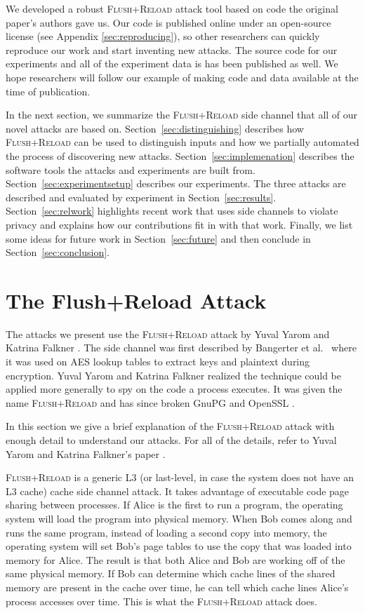 \documentclass[letterpaper,twocolumn,10pt]{article}
\begin{document}
We developed a robust \textsc{Flush+Reload} attack tool based on code the
original paper's authors gave us. Our code is published online under an
open-source license (see Appendix \ref{sec:reproducing}), so other researchers
can quickly reproduce our work and start inventing new attacks. The source code
for our experiments and all of the experiment data is has been published as
well. We hope researchers will follow our example of making code and data
available at the time of publication.

In the next section, we summarize the \textsc{Flush+Reload} side channel that
all of our novel attacks are based on. Section~\ref{sec:distinguishing}
describes how \textsc{Flush+Reload} can be used to distinguish inputs and how we
partially automated the process of discovering new attacks.
Section~\ref{sec:implemenation} describes the software tools the attacks and
experiments are built from. Section~\ref{sec:experimentsetup} describes our
experiments. The three attacks are described and evaluated by experiment in
Section~\ref{sec:results}. Section~\ref{sec:relwork} highlights recent work that
uses side channels to violate privacy and explains how our contributions fit in
with that work. Finally, we list some ideas for future work in
Section~\ref{sec:future} and then conclude in Section~\ref{sec:conclusion}.

\section{The Flush+Reload Attack}
\label{sec:flushreload}

The attacks we present use the \textsc{Flush+Reload} attack by Yuval Yarom and
Katrina Falkner \cite{yarom2013flush}. The side channel was first described by
Bangerter et al.\ \cite{gullasch2011cache} where it was used on AES lookup
tables to extract keys and plaintext during encryption. Yuval Yarom and Katrina
Falkner realized the technique could be applied more generally to spy on the
code a process executes. It was given the name \textsc{Flush+Reload} and has
since broken GnuPG \cite{yarom2013flush} and OpenSSL \cite{benger2014ooh,
yarom2014recovering}.

In this section we give a brief explanation of the \textsc{Flush+Reload} attack
with enough detail to understand our attacks. For all of the details, refer to
Yuval Yarom and Katrina Falkner's paper \cite{yarom2013flush}.

\textsc{Flush+Reload} is a generic L3 (or last-level, in case the system does
not have an L3 cache) cache side channel attack. It takes advantage of
executable code page sharing between processes. If Alice is the first to run
a program, the operating system will load the program into physical memory. When
Bob comes along and runs the same program, instead of loading a second copy into
memory, the operating system will set Bob's page tables to use the copy that was
loaded into memory for Alice. The result is that both Alice and Bob are working
off of the same physical memory. If Bob can determine which cache lines of the
shared memory are present in the cache over time, he can tell which cache lines
Alice's process accesses over time. This is what the \textsc{Flush+Reload}
attack does.
\end{document}
